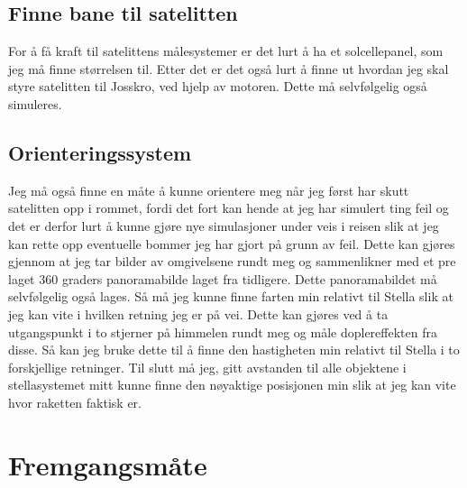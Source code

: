 \documentclass[11pt, A4paper, norsk]{report}
\begin{document}
		\subsection{Finne bane til satelitten}
For å få kraft til satelittens målesystemer er det lurt å ha et solcellepanel, som jeg må finne størrelsen til. Etter det er det også lurt å finne ut hvordan jeg skal styre satelitten til Josskro, ved hjelp av motoren. Dette må selvfølgelig også simuleres.

		\subsection{Orienteringssystem}
Jeg må også finne en måte å kunne orientere meg når jeg først har skutt satelitten opp i rommet, fordi det fort kan hende at jeg har simulert ting feil og det er derfor lurt å kunne gjøre nye simulasjoner under veis i reisen slik at jeg kan rette opp eventuelle bommer jeg har gjort på grunn av feil. Dette kan gjøres gjennom at jeg tar bilder av omgivelsene rundt meg og sammenlikner med et pre laget 360 graders panoramabilde laget fra tidligere. Dette panoramabildet må selvfølgelig også lages.
Så må jeg kunne finne farten min relativt til Stella slik at jeg kan vite i hvilken retning jeg er på vei. Dette kan gjøres ved å ta utgangspunkt i to stjerner på himmelen rundt meg og måle doplereffekten fra disse. Så kan jeg bruke dette til å finne den hastigheten min relativt til Stella i to forskjellige retninger.
Til slutt må jeg, gitt avstanden til alle objektene i stellasystemet mitt kunne finne den nøyaktige posisjonen min slik at jeg kan vite hvor raketten faktisk er.


	\section{Fremgangsmåte}
\end{document}
